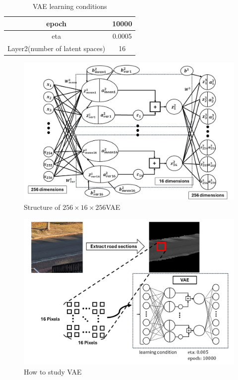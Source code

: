 \documentclass[conference]{IEEEtran}
\begin{document}
\begin{table}[b]
    \centering
    \caption{VAE learning conditions}
    \small
    \begin{tabular}{|c|c|} \hline
      epoch & 10000 \\ \hline
      eta & 0.0005 \\ \hline
      Layer2(number of latent spaces) & 16 \\ \hline
    \end{tabular}
    \label{tb:2}
  \end{table}

\begin{figure}[tb]
    \begin{center}
      \includegraphics[width=0.98\columnwidth]{figures/VAE_1.png}
    \end{center}
    \caption{Structure of $256\times16\times256$VAE}
    \label{fig:2-2-2-1}
  \end{figure}
  
  \begin{figure}[tb]
    \begin{center}
      \includegraphics[width=0.98\columnwidth]{figures/VAE_2.png}
    \end{center}
    \caption{How to study VAE}
    \label{fig:2-2-2-2}
  \end{figure}
\end{document}

